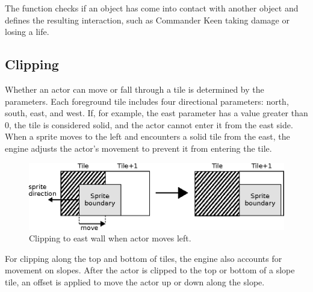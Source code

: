 \documentclass[book.tex]{subfiles}
\begin{document}
\par
\begin{minipage}{\textwidth}
  
\end{minipage}
\label{state_type}

\par
The  function checks if an object has come into contact with another object and defines the resulting interaction, such as Commander Keen taking damage or losing a life.



\subsection{Clipping}
\label{section:clipping}
Whether an actor can move or fall through a tile is determined by the  parameters. Each foreground tile includes four directional parameters: north, south, east, and west. If, for example, the east parameter has a value greater than 0, the tile is considered solid, and the actor cannot enter it from the east side. When a sprite moves to the left and encounters a solid tile from the east, the engine adjusts the actor's movement to prevent it from entering the tile.\\


\begin{figure}[H]
  \centering
  \includegraphics[width=\textwidth]{imgs/drawings/clipping_east.eps}
  \caption{Clipping to east wall when actor moves left.}
  \label{fig:clipping_east}  
\end{figure}

\par
\begin{minipage}{\textwidth}
  
\end{minipage}
\label{wallclip_array}
\par
For clipping along the top and bottom of tiles, the engine also accounts for movement on slopes. After the actor is clipped to the top or bottom of a slope tile, an offset is applied to move the actor up or down along the slope. \\
\end{document}
